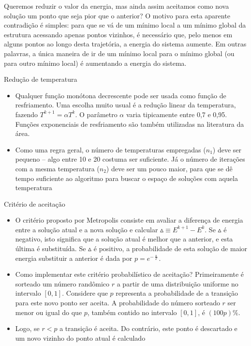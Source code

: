 \documentclass{beamer}
\begin{document}
\begin{frame}
    Queremos reduzir o valor da energia, mas ainda assim aceitamos como nova solução um
ponto que seja pior que o anterior? O motivo para esta aparente contradição é simples: para que se
vá de um mínimo local a um mínimo global da estrutura acessando apenas pontos vizinhos, é
necessário que, pelo menos em alguns pontos ao longo desta trajetória, a energia do sistema
aumente. Em outras palavras, a única maneira de ir de um mínimo local para o mínimo global (ou
para outro mínimo local) é aumentando a energia do sistema.
\end{frame}

\begin{frame}{Redução de temperatura}
    \begin{itemize}
        \item Qualquer função monótona decrescente pode ser usada como função de resfriamento. Uma
        escolha muito usual é a redução linear da temperatura, fazendo $T^{k+1} = \alpha T^k$. O parâmetro $\alpha$ varia tipicamente entre 0,7 e 0,95. Funções exponenciais de resfriamento são também utilizadas na
        literatura da área.
        \item Como uma regra geral, o número de temperaturas
        empregadas ($n_1$) deve ser pequeno – algo entre 10 e 20 costuma ser suficiente. Já o número de
        iterações com a mesma temperatura ($n_2$) deve ser um pouco maior, para que se dê tempo suficiente
        ao algoritmo para buscar o espaço de soluções com aquela temperatura
    \end{itemize}
\end{frame}

\begin{frame}{Critério de aceitação}
    \begin{itemize}
        \item O critério proposto por Metropolis consiste em avaliar a diferença de energia entre a solução
        atual e a nova solução e calcular $\vartriangle \equiv E^{k+1} -E^k$. Se $\vartriangle$ é negativo, isto significa que a solução atual é
        melhor que a anterior, e esta última é substituída. Se $\vartriangle$ é positivo, a probabilidade de esta solução de
        maior energia substituir a anterior é dada por $p = e ^ {-\frac{\vartriangle}{T}}$.\\
        \item Como implementar este critério probabilístico de aceitação? Primeiramente é sorteado um
        número randômico $r$ a partir de uma distribuição uniforme no intervalo $[0,1]$. Considere que $p$
        representa a probabilidade de a transição para este novo ponto ser aceita. A probabilidade do
        número sorteado $r$ ser menor ou igual do que $p$, também contido no intervalo $[0,1]$, é $(100p)\%$.
        \item  Logo, se $r < p$ a transição é aceita. Do contrário, este ponto é descartado e um novo vizinho do ponto atual é calculado
    \end{itemize}
\end{frame}
\end{document}
